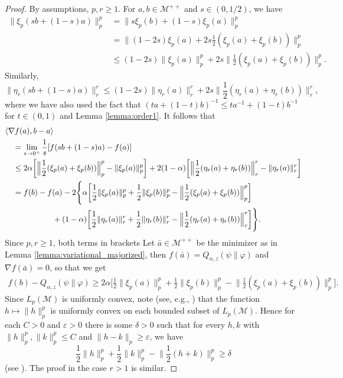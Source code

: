 \documentclass[12pt]{article}
\theoremstyle{definition}
\theoremstyle{remark}
\numberwithin{equation}{section}
\def\Me{\mathcal M}
\def\<{\langle}
\def\>{\rangle}
\begin{document}
\begin{proof} By assumptions, $p,r\ge 1$.  For
$a,b\in \Me^{++}$ and $s\in (0,1/2)$, we have
\begin{align*}
\|\xi_p(sb+(1-s)a)\|_p^p&=\|s\xi_p(b)+(1-s)\xi_p(a)\|_p^p\\
&=\Big\|(1-2s)\xi_p(a)+2s\frac12(\xi_p(a)+\xi_p(b))\Big\|_p^p\\
&\le (1-2s)\|\xi_p(a)\|_p^p+2s\Big\|\frac12(\xi_p(a)+\xi_p(b))\Big\|_p^p.
\end{align*}
Similarly,
\[
\|\eta_r(sb+(1-s)a)\|_r^r\le
(1-2s)\|\eta_r(a)\|_r^r+2s\Big\|\frac12(\eta_r(a)+\eta_r(b))\Big\|_r^r,
\]
where we have also used the fact that $(t a+(1-t)b)^{-1}\le t
a^{-1}+(1-t)b^{-1}$ for $t\in (0,1)$ and Lemma \ref{lemma:order1}. It follows that
\begin{align*}
&\<\nabla f(a),b-a\>\\
&\quad=\lim_{s\to 0^+} {1\over s}[ f(sb+(1-s)a)-f(a)]\\
&\quad\le 2\alpha\biggl[\Big\|\frac12(\xi_p(a)+\xi_p(b))\Big\|_p^p-\|\xi_p(a)\|_p^p\biggr]
+2(1-\alpha)\biggl[\Big\|\frac12(\eta_r(a)+\eta_r(b))\Big\|_r^r-\|\eta_r(a)\|_r^r\biggr]\\
&\quad=f(b)-f(a)-2\Biggl\{\alpha\biggl[\frac12 \|\xi_p(a)\|_p^p
+\frac12 \|\xi_p(b)\|_p^p-\Big\|\frac12(\xi_p(a)+\xi_p(b))\Big\|_p^p\biggr]\\
&\qquad\qquad\qquad+(1-\alpha)\biggl[\frac12 \|\eta_r(a)\|_r^r+\frac12 \|\eta_r(b)\|_r^r
-\Big\|\frac12(\eta_r(a)+\eta_r(b))\Big\|_r^r\biggr]\Biggr\}.
\end{align*}
Since $p,r\ge 1$, both terms in brackets
Let $\bar a\in \Me^{++}$ be the minimizer as in Lemma \ref{lemma:variational_majorized},
then $f(\bar a)=Q_{\alpha,z}(\psi\|\varphi)$ and $\nabla f(\bar a)=0$, so that we get
\begin{align*}
f(b)-Q_{\alpha,z}(\psi\|\varphi)\ge 2\alpha\biggl[\frac12 \|\xi_p(a)\|_p^p+\frac12 \|\xi_p(b)\|_p^p
-\Big\|\frac12(\xi_p(a)+\xi_p(b))\Big\|_p^p\biggr].
\end{align*}
Since $L_p(\Me)$ is uniformly convex, note (see, e.g., \cite[Theorem 3.7.7]{zalinescu2002convex})
that the function $h\mapsto \|h\|_p^p$ is uniformly convex on each bounded subset of $L_p(\Me)$.
Hence for each $C>0$ and $\varepsilon>0$ there is some $\delta>0$ such that for every $h,k$
with $\|h\|_p^p,\|k\|_p^p\le C$ and $\|h-k\|_p\ge \varepsilon$, we have
\[
\frac12\|h\|_p^p+\frac12\|k\|_p^p-\Big\|\frac12(h+k)\Big\|_p^p\ge \delta
\]
(see \cite[p.~288, Exercise 3.3]{zalinescu2002convex}).  The proof in the case $r>1$ is similar. 
\end{proof}
\end{document}
